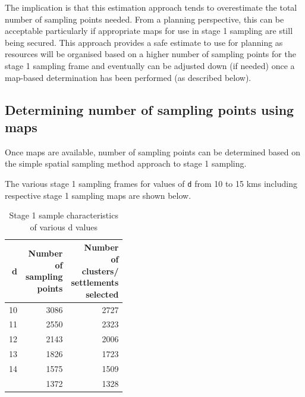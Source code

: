 \documentclass[
  12pt,
  a4paper]{article}
\begin{document}
The implication is that this estimation approach tends to overestimate the total number of sampling points needed. From a planning perspective, this can be acceptable particularly if appropriate maps for use in stage 1 sampling are still being secured. This approach provides a safe estimate to use for planning as resources will be organised based on a higher number of sampling points for the stage 1 sampling frame and eventually can be adjusted down (if needed) once a map-based determination has been performed (as described below).

\hypertarget{determining-number-of-sampling-points-using-maps}{%
\subsection{Determining number of sampling points using maps}\label{determining-number-of-sampling-points-using-maps}}

Once maps are available, number of sampling points can be determined based on the simple spatial sampling method approach to stage 1 sampling.

The various stage 1 sampling frames for values of \texttt{d} from 10 to 15 kms including respective stage 1 sampling maps are shown below.

\begin{table}[H]

\caption{\label{tab:stage1table}Stage 1 sample characteristics of various d values}
\centering
\begin{tabular}[t]{rrr}
\toprule
d & \makecell[c]{Number\\of\\sampling\\points} & \makecell[c]{Number\\of\\clusters/\\settlements\\selected}\\
\midrule
\rowcolor{gray!6}  10 & 3086 & 2727\\
11 & 2550 & 2323\\
\rowcolor{gray!6}  12 & 2143 & 2006\\
13 & 1826 & 1723\\
\rowcolor{gray!6}  14 & 1575 & 1509\\
\addlinespace
15 & 1372 & 1328\\
\bottomrule
\end{tabular}
\end{table}
\end{document}
